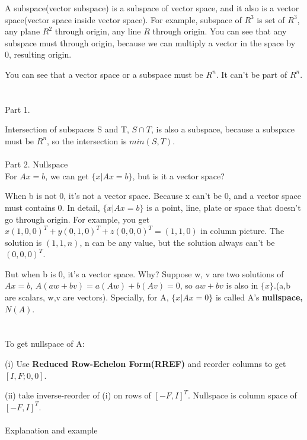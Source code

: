 \documentclass{article}
\begin{document}
\begin{spacing}{1.5}
A subspace(vector subspace) is a subspace of vector space, and it also is a vector space(vector space inside vector space). For example, subspace of $R^3$ is set of $R^3$, any plane $R^2$ through origin, any line $R$ through origin. You can see that any subspace must through origin, because we can multiply a vector in the space by 0, resulting origin.

You can see that a vector space or a subspace must be $R^n$. It can't be part of $R^n$.


\section{}
Part 1.

Intersection of subspaces S and T, $S \cap T$, is also a subspace, because a subspace must be $R^n$, so the intersection is $min(S, T)$. \\
\\ Part 2. Nullspace \\
For $Ax=b$, we can get $\{x|Ax=b\}$, but is it a vector space?

When b is not 0, it's not a vector space. Because x can't be 0, and a vector space must contains 0. In detail, $\{x|Ax=b\}$ is a point, line, plate or space that doesn't go through origin. For example, you get $x(1, 0, 0)^T+y(0, 1, 0)^T+z(0, 0, 0)^T=(1, 1, 0)$ in column picture. The solution is $(1, 1, n)$, n can be any value, but the solution always can't be $(0, 0, 0)^T$.

But when b is 0, it's a vector space. Why? Suppose w, v are two solutions of $Ax=b$, $A(aw+bv)=a(Aw)+b(Av)=0$, so $aw+bv$ is also in $\{x\}$.(a,b are scalars, w,v are vectors). Specially, for A, $\{x|Ax=0\}$ is called A's {\bfseries nullspace, $N(A)$}.

\section{}
To get nullspace of A:

(i) Use {\bfseries Reduced Row-Echelon Form(RREF)} and reorder columns to get $[I, F; 0, 0]$. 

(ii) take inverse-reorder of (i) on rows of $[-F, I]^T$. Nullspace is column space of  $[-F, I]^T$. 
\\\\Explanation and example


\end{spacing}
\end{document}

